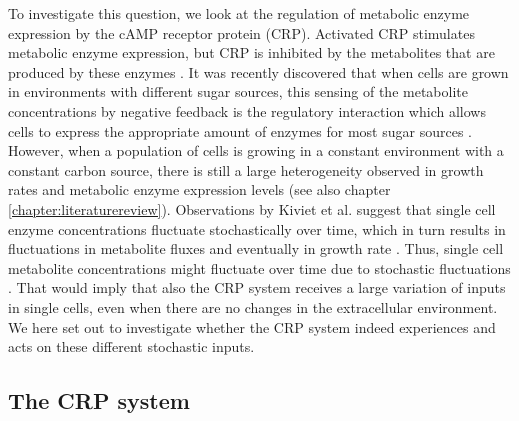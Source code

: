 To investigate this question, we look at the regulation of metabolic enzyme expression by the cAMP receptor protein (CRP).
%
Activated CRP stimulates metabolic enzyme expression, but CRP is inhibited by the metabolites that are produced by these enzymes \cite{You2013}.
%
It was recently discovered that when cells are grown in environments with different sugar sources, 
this sensing of the metabolite concentrations by negative feedback 
is the regulatory interaction which
allows cells to express the appropriate amount of enzymes for most sugar sources \cite{Towbin2017}.
%
However, when a population of cells is growing in a constant environment with a constant carbon source,
there is still a large heterogeneity observed in growth rates and metabolic enzyme expression levels \cite{Kiviet2014} (see also chapter \ref{chapter:literaturereview}).
%
Observations by Kiviet et al. suggest that single cell enzyme concentrations fluctuate stochastically over time, which in turn results in fluctuations in metabolite fluxes and eventually in growth rate \cite{Kiviet2014}.
%
Thus, single cell metabolite concentrations might fluctuate over time due to stochastic fluctuations .
That would imply that also the CRP system receives a large variation of inputs in single cells, even when there are no changes in the extracellular environment.
%
%
We here set out to investigate whether the CRP system indeed experiences and acts on these different stochastic inputs.

\subsection*{The CRP system}

